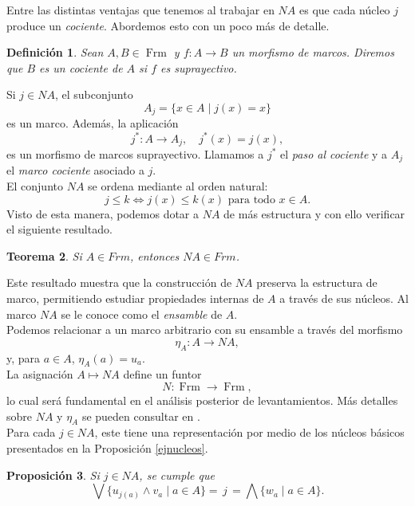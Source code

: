 \documentclass[12pt]{article}
\newtheorem{thm}{Teorema}[section]
\newtheorem{dfn}[thm]{Definición}
\newtheorem{prop}[thm]{Proposición}
\DeclareMathOperator{\Frm}{Frm}
\begin{document}
Entre las distintas ventajas que tenemos al trabajar en $NA$ es que cada núcleo $j$ produce un \emph{cociente}. Abordemos esto con un poco más de detalle.

\begin{dfn}\label{cociente}
Sean $A, B\in \Frm$ y $f\colon A\to B$ un morfismo de marcos. Diremos que $B$ es un \emph{cociente} de $A$ si $f$ es suprayectivo.
\end{dfn}

Si $j\in NA$, el subconjunto
\[
A_j=\{x\in A\mid j(x)=x\}
\]
es un marco. Además, la aplicación
\[
j^*\colon A\to A_j, \quad j^*(x)=j(x),
\]  
es un morfismo de marcos suprayectivo. Llamamos a $j^*$ el \emph{paso al cociente} y a $A_j$ el \emph{marco cociente} asociado a $j$.\\

El conjunto $NA$ se ordena mediante al orden natural:
\[
j\leq k \iff j(x)\leq k(x)\text{ para todo }x\in A.
\]
Visto de esta manera, podemos dotar a $NA$ de más estructura y con ello verificar el siguiente resultado.

\begin{thm}\label{Ensamble}
Si $A\in Frm$, entonces $NA\in Frm$.
\end{thm}

Este resultado muestra que la construcción de $NA$ preserva la estructura de marco, permitiendo estudiar propiedades internas de $A$ a través 
de sus núcleos. Al marco $NA$ se le conoce como el \emph{ensamble} de $A$.\\ 

Podemos relacionar a un marco arbitrario con su ensamble a través 
del morfismo
\[
\eta_A\colon A\to NA,
\]
y, para $a\in A$, $\eta_A(a)=u_a$.\\

La asignación $A\mapsto NA$ define un funtor
\[
N\colon \Frm\to \Frm,
\]
lo cual será fundamental en el análisis posterior de levantamientos. Más detalles sobre $NA$ y $\eta_A$ se pueden consultar en 
\cite{simmons2006assembly,simmonsbasics,simmonscollection,Zaldivar2023}.\\

Para cada $j\in NA$, este tiene una representación por medio de los núcleos básicos
presentados en la Proposición \ref{ejnucleos}.

\begin{prop}\label{basenucleos}
Si $j\in NA$, se cumple que 
\[
\bigvee\{u_{j(a)}\wedge v_a\mid a\in A\}=\, j\, =\bigwedge\{w_a\mid a\in A\}.
\]
\end{prop}
\end{document}
